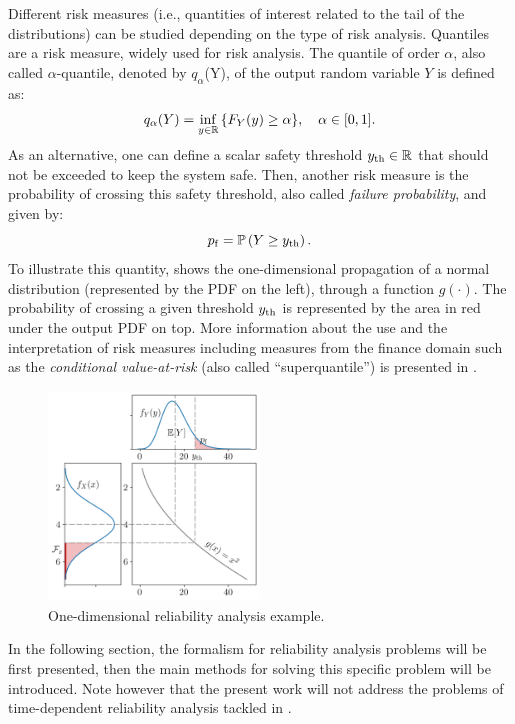 Different risk measures (i.e., quantities of interest related to the tail of the distributions) can be studied depending on the type of risk analysis. 
Quantiles are a risk measure, widely used for risk analysis. 
The quantile of order $\alpha$, also called $\alpha$-quantile, denoted by $q_\alpha$(Y), of the output random variable $Y$ is defined as:
\begin{equation}
    q_\alpha(Y) = \inf_{y\in\mathbb{R}}{\left\{F_Y(y) \geq \alpha\right\}}, \quad \alpha \in [0, 1].    
\end{equation}
As an alternative, one can define a scalar safety threshold $y_\mathrm{th} \in \mathbb{R}$ that should not be exceeded to keep the system safe. 
Then, another risk measure is the probability of crossing this safety threshold, also called \textit{failure probability}, and given by: 
\begin{equation}
    p_\mathrm{f} = \mathbb{P}\left(Y \geq y_\mathrm{th}\right).
    \label{eq:failure_proba}
\end{equation}
To illustrate this quantity,  shows the one-dimensional propagation of a normal distribution (represented by the PDF on the left), through a function $g(\cdot)$.
The probability of crossing a given threshold $y_\mathrm{th}$ is represented by the area in red under the output PDF on top.
More information about the use and the interpretation of risk measures including measures from the finance domain such as the \textit{conditional value-at-risk} (also called ``superquantile'') is presented in \citet{rockafellar_2015}. 

\begin{figure}
    \centering
    \includegraphics[width=0.5\textwidth]{../numerical_experiments/chapter1/figures/1D_reliability.png}
    \caption{One-dimensional reliability analysis example.}
    \label{fig:1D_reliability}
\end{figure}

In the following section, the formalism for reliability analysis problems will be first presented, 
then the main methods for solving this specific problem will be introduced. 
Note however that the present work will not address the problems of time-dependent reliability analysis tackled in \citet{rackwitz_2001,andrieu_2004_phi2,hawchar_2017}. 

